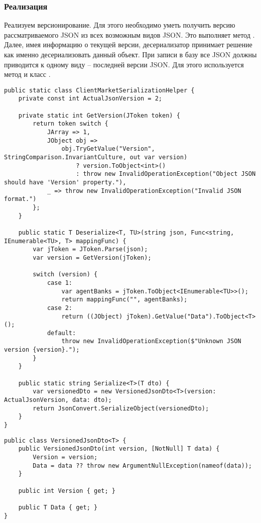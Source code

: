 \documentclass[a4paper,14pt]{extarticle}
\begin{document}
\subsubsection{Реализация}
Реализуем версионирование. Для этого необходимо уметь получить версию рассматриваемого JSON из
всех возможным видов JSON. Это выполняет метод . Далее, имея
информацию о текущей версии, десериализатор принимает решение как именно десериализовать данный
объект. При записи в базу все JSON должны приводится к одному виду -- последней версии JSON.
Для этого используется метод  и класс .
\begin{lstlisting}
public static class ClientMarketSerializationHelper {
    private const int ActualJsonVersion = 2;

    private static int GetVersion(JToken token) {
        return token switch {
            JArray => 1,
            JObject obj =>
                obj.TryGetValue("Version", StringComparison.InvariantCulture, out var version)
                    ? version.ToObject<int>()
                    : throw new InvalidOperationException("Object JSON should have 'Version' property."),
            _ => throw new InvalidOperationException("Invalid JSON format.")
        };
    }

    public static T Deserialize<T, TU>(string json, Func<string, IEnumerable<TU>, T> mappingFunc) {
        var jToken = JToken.Parse(json);
        var version = GetVersion(jToken);

        switch (version) {
            case 1:
                var agentBanks = jToken.ToObject<IEnumerable<TU>>();
                return mappingFunc("", agentBanks);
            case 2:
                return ((JObject) jToken).GetValue("Data").ToObject<T>();
            default:
                throw new InvalidOperationException($"Unknown JSON version {version}.");
        }
    }

    public static string Serialize<T>(T dto) {
        var versionedDto = new VersionedJsonDto<T>(version: ActualJsonVersion, data: dto);
        return JsonConvert.SerializeObject(versionedDto);
    }
}
\end{lstlisting}
\begin{lstlisting}
public class VersionedJsonDto<T> {
    public VersionedJsonDto(int version, [NotNull] T data) {
        Version = version;
        Data = data ?? throw new ArgumentNullException(nameof(data));
    }

    public int Version { get; }

    public T Data { get; }
}
\end{lstlisting}
\end{document}
